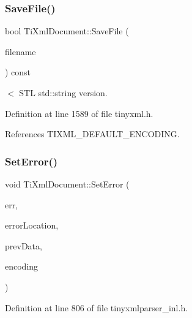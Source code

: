 \hypertarget{class_ti_xml_document_a2b3d316ed658852876d4852cd39c42d8}{}\label{class_ti_xml_document_a2b3d316ed658852876d4852cd39c42d8} 
\subsubsection{\texorpdfstring{Save\+File()}{SaveFile()}\hspace{0.1cm}{\footnotesize\ttfamily [4/4]}}
{\footnotesize\ttfamily bool Ti\+Xml\+Document\+::\+Save\+File (\begin{DoxyParamCaption}\item[{const std\+::string \&}]{filename }\end{DoxyParamCaption}) const\hspace{0.3cm}{\ttfamily [inline]}}



$<$ S\+TL std\+::string version. 



Definition at line 1589 of file tinyxml.\+h.



References T\+I\+X\+M\+L\+\_\+\+D\+E\+F\+A\+U\+L\+T\+\_\+\+E\+N\+C\+O\+D\+I\+NG.

\hypertarget{class_ti_xml_document_a735c23e318597b920c94eae77fa206de}{}\label{class_ti_xml_document_a735c23e318597b920c94eae77fa206de} 
\subsubsection{\texorpdfstring{Set\+Error()}{SetError()}}
{\footnotesize\ttfamily void Ti\+Xml\+Document\+::\+Set\+Error (\begin{DoxyParamCaption}\item[{int}]{err,  }\item[{const char $\ast$}]{error\+Location,  }\item[{\hyperlink{class_ti_xml_parsing_data}{Ti\+Xml\+Parsing\+Data} $\ast$}]{prev\+Data,  }\item[{\hyperlink{tinyxml_8h_a88d51847a13ee0f4b4d320d03d2c4d96}{Ti\+Xml\+Encoding}}]{encoding }\end{DoxyParamCaption})}



Definition at line 806 of file tinyxmlparser\+\_\+inl.\+h.



